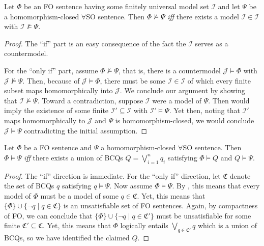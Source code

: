 \documentclass[10pt,a4paper]{amsart}
\theoremstyle{definition}
\numberwithin{equation}{section}
\theoremstyle{plain}
\theoremstyle{definition}
\theoremstyle{myexample}
\theoremstyle{plain}
\newenvironment{customlem}[1]
  {\renewcommand\theinnercustomlem{#1}\innercustomlem}
  {\endinnercustomlem}
\newenvironment{customthm}[1]
  {\renewcommand\theinnercustomthm{#1}\innercustomthm}
  {\endinnercustomthm}
\theoremstyle{definition}
\newcommand{\instance}{\mathcal{I}}
\newcommand{\iffi}{\textit{iff} } %
\begin{document}
\begin{customthm}{\ref{thm:universal}}
Let $\Phi$ be an FO sentence having some finitely universal model set $\mathscr{I}$ and let $\Psi$ be a homomorphism-closed $\forall$SO sentence. Then $\Phi \not \models \Psi$ \iffi there exists a model $\instance \in \mathscr{I}$ with $\instance \not\models \Psi$.
\end{customthm}

\begin{proof}
The ``if'' part is an easy consequence of the fact the $\instance$ serves as a countermodel.

For the ``only if'' part, assume $\Phi \not \models \Psi$, that is, there is a countermodel $\mathcal{J} \models \Phi$ with $\mathcal{J} \not\models \Psi$. Then, because of $\mathcal{J} \models \Phi$, there must be some $\instance \in \mathscr{I}$ of which every finite subset maps homomorphically into $\mathcal{J}$. We conclude our argument by showing that $\instance \not\models \Psi$. Toward a contradiction, suppose $\instance$ were a model of $\Psi$. Then  would imply the existence of some finite $\instance' \subseteq \instance$ with $\instance' \models \Psi$. Yet then, noting that $\instance'$ maps homomorphically to $\mathcal{J}$ and $\Psi$ is homomorphism-closed, we would conclude $\mathcal{J} \models \Psi$ contradicting the initial assumption.
\end{proof}


\begin{customlem}{\ref{lem:interpolation}}
Let $\Phi$ be a FO sentence and $\Psi$ a homomorphism-closed $\forall$SO sentence.
Then $\Phi \models \Psi$ \iffi there exists a union of BCQs $Q = \bigvee_{i=1}^n q_{i}$ satisfying $\Phi \models Q$ and $Q \models \Psi$.
\end{customlem}

\begin{proof}
The ``if'' direction is immediate.
For the ``only if'' direction, let $\mathfrak{C}$ denote the set of BCQs $q$ satisfying $q \models \Psi$.
Now assume $\Phi \models \Psi$. By , this means that every model of $\Phi$
must be a model of some $q \in \mathfrak{C}$. Yet, this means that $\{\Phi\} \cup \{\neg q \mid q \in \mathfrak{C}\}$ is an unsatisfiable set of FO sentences. Again, by compactness of FO, we can conclude that $\{\Phi\} \cup \{\neg q \mid q \in \mathfrak{C}'\}$ must be unsatisfiable for some finite $\mathfrak{C}' \subseteq \mathfrak{C}$. Yet, this means that $\Phi$ logically entails $\bigvee_{q \in \mathfrak{C}'} q$ which is a union of BCQs, so we have identified the claimed $Q$.
\end{proof}
\end{document}
